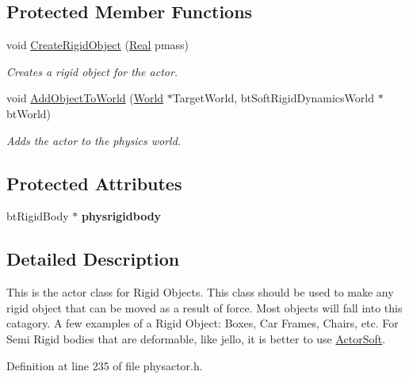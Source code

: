 \subsection*{Protected Member Functions}
\begin{DoxyCompactItemize}
\item 
void \hyperlink{classphys_1_1ActorRigid_a19227c52b972cd96ad69a7b6273e2bbf}{CreateRigidObject} (\hyperlink{namespacephys_af7eb897198d265b8e868f45240230d5f}{Real} pmass)
\begin{DoxyCompactList}\small\item\em Creates a rigid object for the actor. \item\end{DoxyCompactList}\item 
void \hyperlink{classphys_1_1ActorRigid_a3c56eb06fe6a7d468b7a67c45ade7be4}{AddObjectToWorld} (\hyperlink{classphys_1_1World}{World} $\ast$TargetWorld, btSoftRigidDynamicsWorld $\ast$btWorld)
\begin{DoxyCompactList}\small\item\em Adds the actor to the physics world. \item\end{DoxyCompactList}\end{DoxyCompactItemize}
\subsection*{Protected Attributes}
\begin{DoxyCompactItemize}
\item 
\hypertarget{classphys_1_1ActorRigid_a690889f942e177644f4f8521f509c88d}{
btRigidBody $\ast$ {\bfseries physrigidbody}}
\label{d8/d71/classphys_1_1ActorRigid_a690889f942e177644f4f8521f509c88d}

\end{DoxyCompactItemize}


\subsection{Detailed Description}
This is the actor class for Rigid Objects. This class should be used to make any rigid object that can be moved as a result of force. Most objects will fall into this catagory. A few examples of a Rigid Object: Boxes, Car Frames, Chairs, etc. For Semi Rigid bodies that are deformable, like jello, it is better to use \hyperlink{classphys_1_1ActorSoft}{ActorSoft}. 

Definition at line 235 of file physactor.h.



